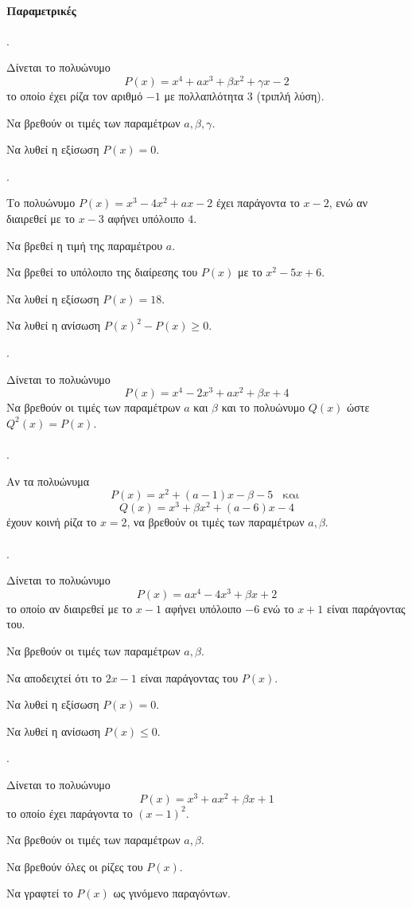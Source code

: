 \documentclass[11pt,a4paper,twocolumn]{article}
\newcounter{askhsh}
\newcommand{\askhsh}{\large\theaskhsh.\ \addtocounter{askhsh}{1}}
\begin{document}
\paragraph{Παραμετρικές}
\askhsh Δίνεται το πολυώνυμο \[ P(x)=x^4+ax^3+\beta x^2+\gamma x-2 \] το οποίο έχει ρίζα τον αριθμό $ -1 $ με πολλαπλότητα 3 (τριπλή λύση).
\begin{alist}
\item Να βρεθούν οι τιμές των παραμέτρων $ a,\beta,\gamma $.
\item Να λυθεί η εξίσωση $ P(x)=0 $.
\end{alist}
\askhsh Το πολυώνυμο $ P(x)=x^3-4x^2+ax-2 $ έχει παράγοντα το $ x-2 $, ενώ αν διαιρεθεί με το $ x-3 $ αφήνει υπόλοιπο $ 4 $.
\begin{alist}
\item Να βρεθεί η τιμή της παραμέτρου $ a $.
\item Να βρεθεί το υπόλοιπο της διαίρεσης του $ P(x) $ με το $ x^2-5x+6 $.
\item Να λυθεί η εξίσωση $ P(x)=18 $.
\item Να λυθεί η ανίσωση $ P(x)^2-P(x)\geq 0 $.
\end{alist}
\askhsh Δίνεται το πολυώνυμο \[ P(x)=x^4-2x^3+ax^2+\beta x+4 \] Να βρεθούν οι τιμές των παραμέτρων $ a $ και $ \beta $ και το πολυώνυμο $ Q(x) $ ώστε $ Q^2(x)=P(x) $.\\\\
\askhsh Αν τα πολυώνυμα \[ P(x)=x^2+(a-1)x-\beta-5
\;\;\textrm{ και }\]
\[Q(x) = x^3+\beta x^2+(a-6)x-4 \] έχουν κοινή ρίζα το $ x=2 $, να βρεθούν οι τιμές των παραμέτρων $ a,\beta $.\\\\
\askhsh Δίνεται το πολυώνυμο \[ P(x)=ax^4-4x^3+\beta x+2 \] το οποίο αν διαιρεθεί με το $ x-1 $ αφήνει υπόλοιπο $ -6 $ ενώ το $ x+1 $ είναι παράγοντας του.
\begin{alist}
\item Να βρεθούν οι τιμές των παραμέτρων $ a,\beta $.
\item Να αποδειχτεί ότι το $ 2x-1 $ είναι παράγοντας του $ P(x) $.
\item Να λυθεί η εξίσωση $ P(x)=0 $.
\item Να λυθεί η ανίσωση $ P(x)\leq0 $.
\end{alist}
\askhsh Δίνεται το πολυώνυμο \[ P(x)=x^3+ax^2+\beta x+1 \] το οποίο έχει παράγοντα το $ \left(x-1\right)^2 $.
\begin{alist}
\item Να βρεθούν οι τιμές των παραμέτρων $ a,\beta $.
\item Να βρεθούν όλες οι ρίζες του $ P(x) $.
\item Να γραφτεί το $P(x)$ ως γινόμενο παραγόντων.
\end{alist}
\end{document}
